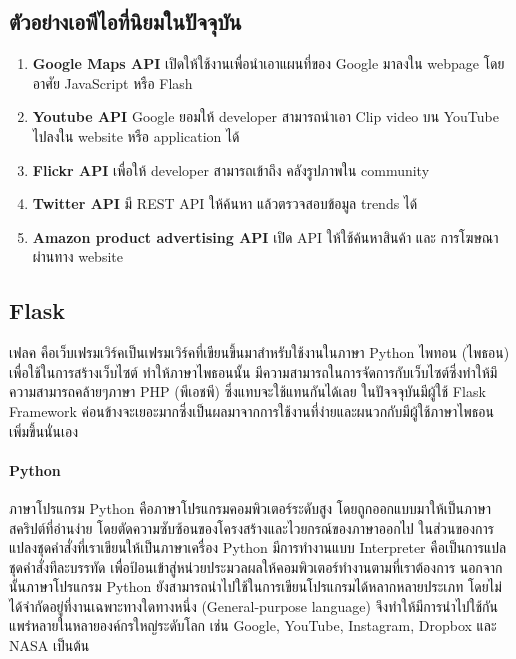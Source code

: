   \subsection*{ตัวอย่างเอพีไอที่นิยมในปัจจุบัน}
    \begin{enumerate}
      \itemsep0em 
      \item \textbf{Google Maps API} เปิดให้ใช้งานเพื่อนำเอาแผนที่ของ Google มาลงใน webpage โดยอาศัย JavaScript หรือ Flash
      \item \textbf{Youtube API} Google ยอมให้ developer สามารถนำเอา Clip video บน YouTube ไปลงใน website หรือ application ได้
      \item \textbf{Flickr API} เพื่อให้ developer สามารถเข้าถึง คลังรูปภาพใน community
      \item \textbf{Twitter API} มี REST API ให้ค้นหา แล้วตรวจสอบข้อมูล trends ได้
      \item \textbf{Amazon product advertising API} เปิด API ให้ใช้ค้นหาสินค้า และ การโฆษณาผ่านทาง website
    \end{enumerate}

  \subsection{Flask}
  เฟลค คือเว็บเฟรมเวิร์คเป็นเฟรมเวิร์คที่เขียนขึ้นมาสำหรับใช้งานในภาษา Python   ไพทอน (ไพธอน)  เพื่อใช้ในการสร้างเว็บไซต์ ทำให้ภาษาไพธอนนั้น มีความสามารถในการจัดการกับเว็บไซต์ซึ่งทำให้มึความสามารถคล้ายๆภาษา PHP (พีเอชพี)  ซึ่งแทบจะใช้แทนกันได้เลย  ในปัจจจุบันมีผู้ใช้ Flask Framework ค่อนข้างจะเยอะมากซึ่งเป็นผลมาจากการใช้งานที่ง่ายและผนวกกับมีผู้ใช้ภาษาไพธอนเพิ่มขึ้นนั่นเอง
    \paragraph*{Python} ภาษาโปรแกรม Python \cite{python} คือภาษาโปรแกรมคอมพิวเตอร์ระดับสูง โดยถูกออกแบบมาให้เป็นภาษาสคริปต์ที่อ่านง่าย  โดยตัดความซับซ้อนของโครงสร้างและไวยกรณ์ของภาษาออกไป ในส่วนของการแปลงชุดคำสั่งที่เราเขียนให้เป็นภาษาเครื่อง Python มีการทำงานแบบ Interpreter คือเป็นการแปลชุดคำสั่งทีละบรรทัด เพื่อป้อนเข้าสู่หน่วยประมวลผลให้คอมพิวเตอร์ทำงานตามที่เราต้องการ นอกจากนั้นภาษาโปรแกรม Python ยังสามารถนำไปใช้ในการเขียนโปรแกรมได้หลากหลายประเภท โดยไม่ได้จำกัดอยู่ที่งานเฉพาะทางใดทางหนึ่ง (General-purpose language) จึงทำให้มีการนำไปใช้กันแพร่หลายในหลายองค์กรใหญ่ระดับโลก เช่น Google, YouTube, Instagram, Dropbox และ NASA เป็นต้น 


